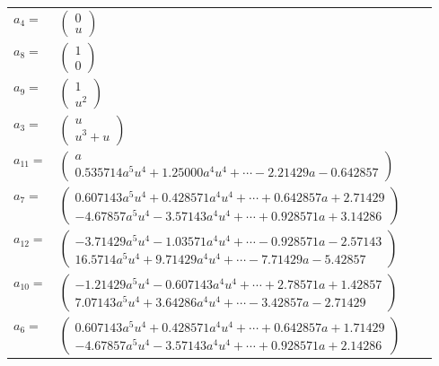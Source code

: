 \documentclass[1p]{elsarticle_modified}
\theoremstyle{definition}
\begin{document}
\begin{tabular}{m{7pt} m{180pt} m{7pt} m{180pt} }
\flushright $a_{4}=$&$\begin{pmatrix}0\\u\end{pmatrix}$ \\
\flushright $a_{8}=$&$\begin{pmatrix}1\\0\end{pmatrix}$ \\
\flushright $a_{9}=$&$\begin{pmatrix}1\\u^2\end{pmatrix}$ \\
\flushright $a_{3}=$&$\begin{pmatrix}u\\u^3+u\end{pmatrix}$ \\
\flushright $a_{11}=$&$\begin{pmatrix}a\\0.535714 a^{5} u^{4}+1.25000 a^{4} u^{4}+\cdots-2.21429 a-0.642857\end{pmatrix}$ \\
\flushright $a_{7}=$&$\begin{pmatrix}0.607143 a^{5} u^{4}+0.428571 a^{4} u^{4}+\cdots+0.642857 a+2.71429\\-4.67857 a^{5} u^{4}-3.57143 a^{4} u^{4}+\cdots+0.928571 a+3.14286\end{pmatrix}$ \\
\flushright $a_{12}=$&$\begin{pmatrix}-3.71429 a^{5} u^{4}-1.03571 a^{4} u^{4}+\cdots-0.928571 a-2.57143\\16.5714 a^{5} u^{4}+9.71429 a^{4} u^{4}+\cdots-7.71429 a-5.42857\end{pmatrix}$ \\
\flushright $a_{10}=$&$\begin{pmatrix}-1.21429 a^{5} u^{4}-0.607143 a^{4} u^{4}+\cdots+2.78571 a+1.42857\\7.07143 a^{5} u^{4}+3.64286 a^{4} u^{4}+\cdots-3.42857 a-2.71429\end{pmatrix}$ \\
\flushright $a_{6}=$&$\begin{pmatrix}0.607143 a^{5} u^{4}+0.428571 a^{4} u^{4}+\cdots+0.642857 a+1.71429\\-4.67857 a^{5} u^{4}-3.57143 a^{4} u^{4}+\cdots+0.928571 a+2.14286\end{pmatrix}$ \\

\end{tabular}
\end{document}

